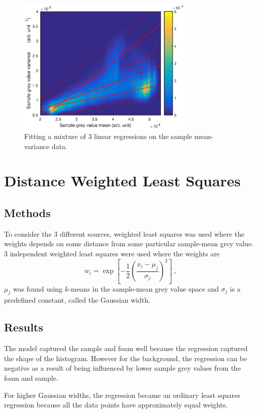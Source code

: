 \documentclass[12pt]{report}
\begin{document}
\begin{figure}
	\centering	
	\includegraphics[width=0.75\textwidth]{figures/meanVar/mixture_histogram.eps}
	\caption{Fitting a mixture of 3 linear regressions on the sample mean-variance data.}
	\label{fig:mixture_histogram}
\end{figure}

\section{Distance Weighted Least Squares}
\subsection{Methods}
To consider the 3 different sources, weighted least squares was used where the weights depends on some distance from some particular sample-mean grey value. 3 independent weighted least squares were used where the weights are
\begin{equation}
w_i=\exp\left[-\frac{1}{2}\left(\frac{x_i-\mu_j}{\sigma_j}\right)^2\right] \ ,
\end{equation}
$\mu_j$ was found using $k$-means in the sample-mean grey value space and $\sigma_j$ is a predefined constant, called the Gaussian width.

\subsection{Results}
The model captured the sample and foam well because the regression captured the shape of the histogram. However for the background, the regression can be negative as a result of being influenced by lower sample grey values from the foam and sample.

For higher Gaussian widths, the regression became an ordinary least squares regression because all the data points have approximately equal weights.
\end{document}
